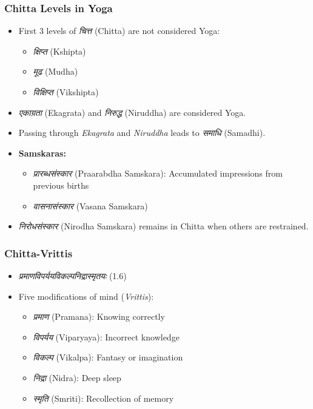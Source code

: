 \begin{frame}[fragile]\frametitle{Chitta Levels in Yoga}

    \begin{itemize}
        \item First 3 levels of \textit{चित्त} (Chitta) are not considered Yoga:
        \begin{itemize}
            \item \textit{क्षिप्त} (Kshipta)
            \item \textit{मूढ} (Mudha)
            \item \textit{विक्षिप्त} (Vikshipta)
        \end{itemize}
        \item \textit{एकाग्रता} (Ekagrata) and \textit{निरुद्ध} (Niruddha) are considered Yoga.
        \item Passing through \textit{Ekagrata} and \textit{Niruddha} leads to \textit{समाधि} (Samadhi).
        \item \textbf{Samskaras:}
        \begin{itemize}
            \item \textit{प्रारब्धसंस्कार} (Praarabdha Samskara): Accumulated impressions from previous births
            \item \textit{वासनासंस्कार} (Vasana Samskara)
        \end{itemize}
        \item \textit{निरोधसंस्कार} (Nirodha Samskara) remains in Chitta when others are restrained.
    \end{itemize}

\end{frame}

\begin{frame}[fragile]\frametitle{Chitta-Vrittis}
    \begin{itemize}
        \item \textit{प्रमाणविपर्ययविकल्पनिद्रास्मृतयः} (1.6)
        \item Five modifications of mind (\textit{Vrittis}):
        \begin{itemize}
            \item \textit{प्रमाण} (Pramana): Knowing correctly
            \item \textit{विपर्यय} (Viparyaya): Incorrect knowledge
            \item \textit{विकल्प} (Vikalpa): Fantasy or imagination
            \item \textit{निद्रा} (Nidra): Deep sleep
            \item \textit{स्मृति} (Smriti): Recollection of memory
        \end{itemize}
    \end{itemize}
\end{frame}

